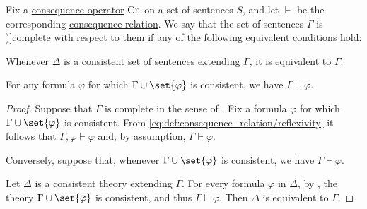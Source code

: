 \begin{definition}\label{def:complete_set_of_sentences}
  Fix a \hyperref[def:consequence_operator]{consequence operator} \( \op{Cn} \) on a set of sentences \( S \), and let \( {\vdash} \) be the corresponding \hyperref[def:consequence_relation]{consequence relation}. We say that the set of sentences \( \Gamma \) is \term[ru=полное (множество формул) (\cite[def. 1.3.16]{Герасимов2011})]{complete} with respect to them if any of the following equivalent conditions hold:
  \begin{thmenum}
     Whenever \( \Delta \) is a \hyperref[def:consistent_set_of_sentences]{consistent} set of sentences extending \( \Gamma \), it is \hyperref[def:logical_theory/equivalent]{equivalent} to \( \Gamma \).

     For any formula \( \varphi \) for which \( \Gamma \cup \set{ \varphi } \) is consistent, we have \( \Gamma \vdash \varphi \).
  \end{thmenum}
\end{definition}
\begin{proof}
   Suppose that \( \Gamma \) is complete in the sense of . Fix a formula \( \varphi \) for which \( \Gamma \cup \set{ \varphi } \) is consistent. From \eqref{eq:def:consequence_relation/reflexivity} it follows that \( \Gamma, \varphi \vdash \varphi \) and, by assumption, \( \Gamma \vdash \varphi \).

   Conversely, suppose that, whenever \( \Gamma \cup \set{ \varphi } \) is consistent, we have \( \Gamma \vdash \varphi \).

  Let \( \Delta \) is a consistent theory extending \( \Gamma \). For every formula \( \varphi \) in \( \Delta \), by , the theory \( \Gamma \cup \set{ \varphi } \) is consistent, and thus \( \Gamma \vdash \varphi \). Then \( \Delta \) is equivalent to \( \Gamma \).
\end{proof}

